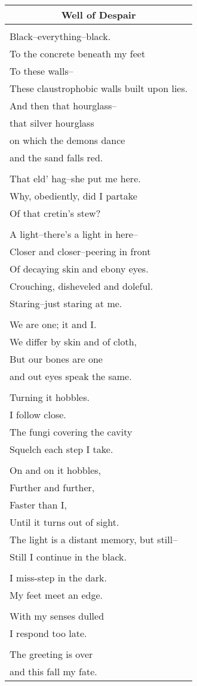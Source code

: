 \documentclass{article}
\begin{document}
\begin{center}
\begin{tabular}{l}
\multicolumn{1}{c}{\textbf{Well of Despair}} \\ \hline
\\
Black--everything--black. \\
To the concrete beneath my feet \\
To these walls-- \\
These claustrophobic walls built upon lies. \\
And then that hourglass-- \\
that silver hourglass \\
on which the demons dance \\
and the sand falls red. \\
\\
That eld' hag--she put me here. \\
Why, obediently, did I partake \\
Of that cretin's stew? \\
\\
A light--there's a light in here-- \\
Closer and closer--peering in front \\
Of decaying skin and ebony eyes. \\
Crouching, disheveled and doleful. \\
Staring--just staring at me. \\
\\
We are one; it and I. \\
We differ by skin and of cloth, \\
But our bones are one \\
and out eyes speak the same. \\
\\
Turning it hobbles. \\
I follow close. \\
The fungi covering the cavity \\
Squelch each step I take. \\
\\
On and on it hobbles, \\
Further and further, \\
Faster than I, \\
Until it turns out of sight. \\
The light is a distant memory, but still-- \\
Still I continue in the black. \\
\\
I miss-step in the dark. \\
My feet meet an edge. \\
\\
With my senses dulled \\
I respond too late. \\
\\
The greeting is over \\
and this fall my fate. \\
\end{tabular}
\end{center}
\end{document}

